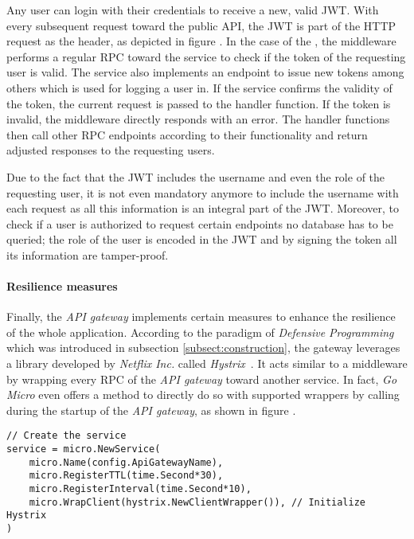 \documentclass[12pt,a4paper,twoside]{report}
\begin{document}
Any user can login with their credentials to receive a new, valid JWT.
With every subsequent request toward the public API, the JWT is part of the
HTTP request as the  header, as depicted
in figure .
In the case of the , the middleware performs
a regular RPC toward the  service to check if the
token of the requesting user is valid. The  service also
implements an endpoint to issue new tokens among others which is used for logging
a user in.
If the service confirms the validity of the token, the current request is passed
to the handler function. If the token is invalid, the middleware directly responds
with an error.
The handler functions then call other RPC endpoints according to their functionality
and return adjusted responses to the requesting users.

Due to the fact that the JWT includes the username and even the role of the
requesting user, it is not even mandatory anymore to include the username with
each request as all this information is an integral part of the JWT.
Moreover, to check if a user is authorized to request certain endpoints no
database has to be queried; the role of the user is encoded in the JWT and
by signing the token all its information are tamper-proof.

\paragraph{Resilience measures}
Finally, the \textit{API gateway} implements certain measures to enhance
the resilience of the whole application.
According to the paradigm of \textit{Defensive Programming} which was introduced
in subsection \ref{subsect:construction}, the gateway leverages a library
developed by \textit{Netflix Inc.} called \textit{Hystrix}~\cite{hystrix}.
It acts similar to a middleware by wrapping every RPC of the
\textit{API gateway} toward another service.
In fact, \textit{Go Micro} even offers a method to directly do so with
supported wrappers by calling  during the startup
of the \textit{API gateway}, as shown in figure .

\begin{lstlisting}[title=api-gateway/main.go, float, floatplacement=H]
// Create the service
service = micro.NewService(
	micro.Name(config.ApiGatewayName),
	micro.RegisterTTL(time.Second*30),
	micro.RegisterInterval(time.Second*10),
	micro.WrapClient(hystrix.NewClientWrapper()), // Initialize Hystrix
)
\end{lstlisting}
\end{document}
